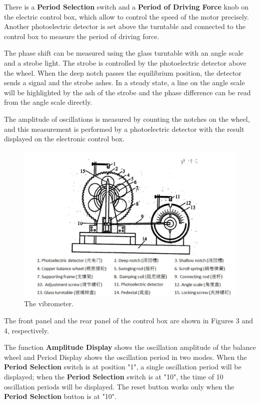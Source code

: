 \documentclass[12pt]{article}
\begin{document}
\par There is a \textbf{Period Selection} switch and a \textbf{Period of Driving Force} knob on the electric control box, which allow to control the speed of the motor precisely. Another photoelectric detector is set above the turntable and connected to the control box to measure the period of driving force.
\par The phase shift can be measured using the glass turntable with an angle scale and
a strobe light. The strobe is controlled by the photoelectric detector above the wheel. When the deep notch passes the equilibrium position, the detector sends a signal and the strobe ashes. In a steady state, a line on the angle scale will be highlighted by the ash of the strobe and the phase difference can be read from the angle scale directly.
\par The amplitude of oscillations is measured by counting the notches on the wheel, and this measurement is performed by a photoelectric detector with the result displayed on the electronic control box.
\begin{figure}[H]
\centering
\includegraphics[scale=0.5]{P2.jpg}
\caption{The vibrometer.}
\end{figure}
\par The front panel and the rear panel of the control box are shown in Figures 3 and 4, respectively.
\par The function \textbf{Amplitude Display} shows the oscillation amplitude of the balance wheel and Period Display shows the oscillation period in two modes. When the \textbf{Period Selection} switch is at position "1", a single oscillation period will be displayed; when the \textbf{Period Selection} switch is at "10", the time of 10 oscillation periods will be displayed. The reset button works only when the \textbf{Period Selection} button is at "10".
\end{document}
